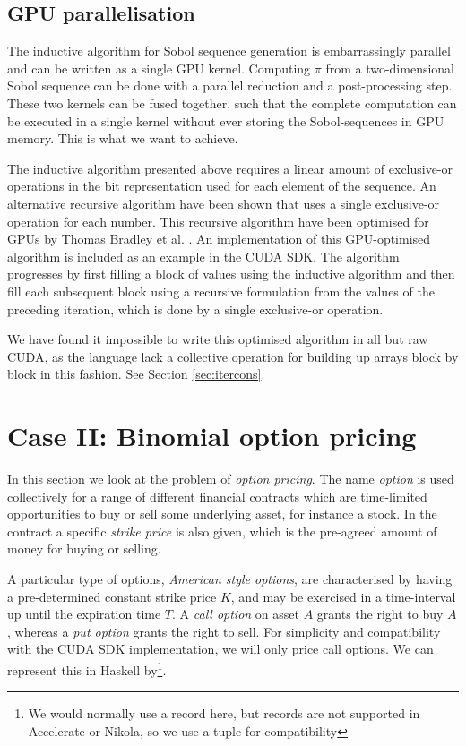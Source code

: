 \documentclass[preprint]{sigplanconf}
\begin{document}

\subsection{GPU parallelisation}
\label{sec:gpusobol}
The inductive algorithm for Sobol sequence generation is
embarrassingly parallel and can be written as a single GPU
kernel. Computing $\pi$ from a two-dimensional Sobol sequence can be
done with a parallel reduction and a post-processing step. These two
kernels can be fused together, such that the complete computation can
be executed in a single kernel without ever storing the
Sobol-sequences in GPU memory. This is what we want to achieve.

The inductive algorithm presented above requires a linear amount of
exclusive-or operations in the bit representation used for each
element of the sequence. An alternative recursive algorithm have been
shown that uses a single exclusive-or operation for each number. This
recursive algorithm have been optimised for GPUs by Thomas Bradley et
al. \cite[Chapter~16]{hwy2011emerald}. An implementation of this
GPU-optimised algorithm is included as an example in the CUDA SDK. The
algorithm progresses by first filling a block of values using the
inductive algorithm and then fill each subsequent block using a
recursive formulation from the values of the preceding iteration,
which is done by a single exclusive-or operation.

We have found it impossible to write this optimised algorithm in all
but raw CUDA, as the language lack a collective operation for building
up arrays block by block in this fashion. See Section
\ref{sec:itercons}.

\section{Case II: Binomial option pricing}
In this section we look at the problem of \emph{option pricing}. The
name \emph{option} is used collectively for a range of different
financial contracts which are time-limited opportunities to buy or
sell some underlying asset, for instance a stock. In the contract a
specific \emph{strike price} is also given, which is the pre-agreed
amount of money for buying or selling.

A particular type of options, \emph{American style options}, are
characterised by having a pre-determined constant strike price $K$,
and may be exercised in a time-interval up until the expiration time
$T$. A \emph{call option} on asset $A$ grants the right to buy $A$,
whereas a \emph{put option} grants the right to sell. For simplicity
and compatibility with the CUDA SDK implementation, we will only price
call options. We can represent this in Haskell by\footnote{We would
  normally use a record here, but records are not supported in
  Accelerate or Nikola, so we use a tuple for compatibility}.
\end{document}
